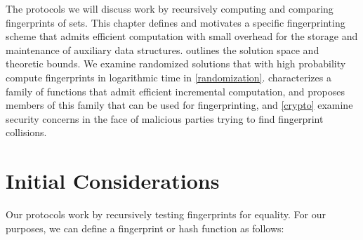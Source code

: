 
The protocols we will discuss work by recursively computing and comparing fingerprints of sets.
This chapter defines and motivates a specific fingerprinting scheme that admits efficient computation with small overhead for the storage and maintenance of auxiliary data structures.  outlines the solution space and theoretic bounds. We examine randomized solutions that with high probability compute fingerprints in logarithmic time in \cref{randomization}.  characterizes a family of functions that admit efficient incremental computation, and  proposes members of this family that can be used for fingerprinting, and \cref{crypto} examine security concerns in the face of malicious parties trying to find fingerprint collisions.

%
%
%

\section{Initial Considerations}
\label{initial-considerations}

Our protocols work by recursively testing fingerprints for equality. For our purposes, we can define a fingerprint or hash function as follows:

